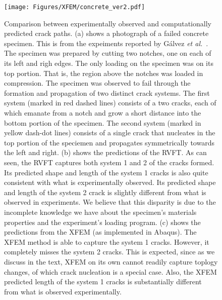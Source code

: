 \documentclass[10pt,letterpaper]{article}
\begin{document}
    \begin{figure}[b]
      \centering
      \texttt{[image: Figures/XFEM/concrete\_ver2.pdf]}
      \caption{Comparison between experimentally observed and computationally predicted crack paths. (a) shows a photograph of a failed concrete specimen. This is from the expeiments reported by G{\'a}lvez \textit{et al.}~\cite{galvez1999fracture}.   The specimen was prepared by  cutting two notches, one  on each of its   left and righ edges.  The only loading on the specimen was on its  top portion. That is,   the region above the notches was loaded in compression. The specimen was observed to fail through the formation and  propagation of two distinct crack systems.  The first system   (marked in red dashed lines)  consists  of a two cracks, each of which  emanate  from a  notch and  grow a short distance into the  bottom portion of the specimen. The second system (marked in yellow dash-dot lines) consists  of a single crack that nucleates in the top portion of the speciemen and propagates symmetrically towards the left and right.  (b) shows the predictions of the RVFT.  As can  seen, the    RVFT captures both system 1 and 2 of the cracks formed. Its predicted shape and length of the  system 1 cracks is also quite consistent with what is experimentally observed.  Its  predicted shape and length of the system 2 crack is  slightly different from what is observed in experiments. We believe that this disparity is due to the incomplete knowledge we have about the specimen's materials properties and the experiment's loading program. (c) shows the predictions from the XFEM (as implemented in Abaqus). The XFEM method is able to capture the system 1 cracks. However, it completely misses the  system 2 cracks. This is expected, since as we discuss in the text, XFEM on its own cannot readily capture  toplogy changes, of which crack nucleation is a special case. Also, the XFEM predicted length of the  system 1 cracks is substantially  different from what is observed experimentally. }
      \label{f:xfem}
\end{figure}

\clearpage
\setcounter{page}{1}
\pagestyle{plain}


\end{document}
